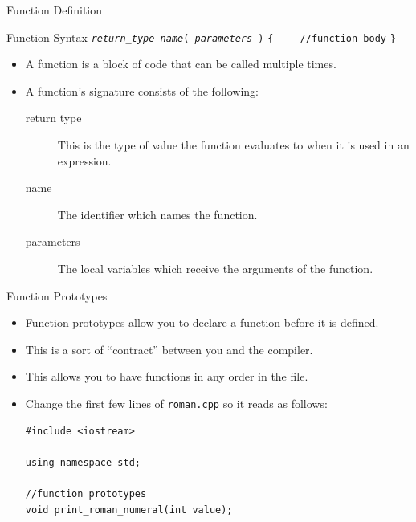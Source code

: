 \documentclass[]{beamer}
\begin{document}
\begin{frame}[fragile]{Function Definition}
    \begin{block}{Function Syntax}
        \texttt{\textit{return\_type} \textit{name}( \textit{parameters} )}
        \newline\texttt{\{}
        \newline\verb!    //function body!
        \newline\texttt{\}}
    \end{block}

    \begin{itemize}[<+(2)->]
        \item A function is a block of code that can be called
            multiple times. 
        \item A function's signature consists of the following:
        \begin{description}
            \item[return type] This is the type of value the function
                evaluates to when it is used in an expression.
            \item[name] The identifier which names the function.
            \item[parameters] The local variables which receive the
                arguments of the function.
        \end{description}
    \end{itemize}
\end{frame}

\begin{frame}[fragile]{Function Prototypes}
    \begin{itemize}[<+->]
        \item Function prototypes allow you to declare a function
            before it is defined.
        \item This is a sort of ``contract'' between you and the
            compiler.
        \item This allows you to have functions in any order in the
            file.  
        \item Change the first few lines of \texttt{roman.cpp} so it
            reads as follows:
            \newline
            \newline
            \begin{BVerbatim}
#include <iostream>

using namespace std;

//function prototypes
void print_roman_numeral(int value);
            \end{BVerbatim}
    \end{itemize}
\end{frame}
\end{document}
